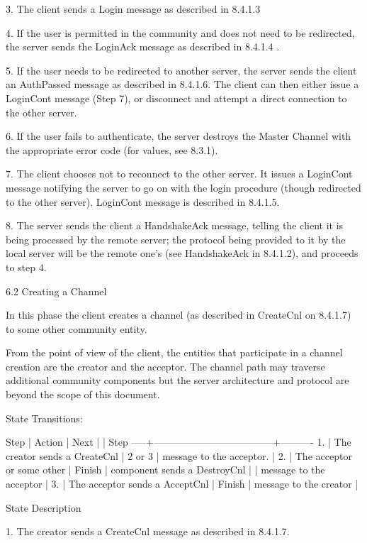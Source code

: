 \documentclass[titlepage,oneside]{book}
\begin{document}
3. The client sends a Login message as described in 8.4.1.3

4. If the user is permitted in the community and does not need to be
redirected, the server sends the LoginAck message as described in
8.4.1.4 .

5. If the user needs to be redirected to another server, the server
sends the client an AuthPassed message as described in 8.4.1.6.
The client can then either issue a LoginCont message (Step 7), or
disconnect and attempt a direct connection to the other server.

6. If the user fails to authenticate, the server destroys the Master
Channel with the appropriate error code (for values, see 8.3.1).

7. The client chooses not to reconnect to the other server. It issues a
LoginCont message notifying the server to go on with the login
procedure (though redirected to the other server). LoginCont message is
described in 8.4.1.5.

8. The server sends the client a HandshakeAck message, telling the
client it is being processed by the remote server; the protocol being
provided to it by the local server will be the remote one's (see
HandshakeAck in 8.4.1.2), and proceeds to step 4.

6.2 Creating a Channel

In this phase the client creates a channel (as described in CreateCnl
on 8.4.1.7) to some other community entity.

From the point of view of the client, the entities that participate in
a channel creation are the creator and the acceptor. The channel path
may traverse additional community components but the server
architecture and protocol are beyond the scope of this document.

State Transitions:

Step | Action                             |  Next
     |                                    |  Step
-----+------------------------------------+----------
1.   | The creator sends a CreateCnl      |  2 or 3
     | message to the acceptor.           |
2.   | The acceptor or some other         |  Finish
     | component sends a DestroyCnl       |
     | message to the acceptor            |
3.   | The acceptor sends a AcceptCnl     |  Finish
     | message to the creator             |

State Description

1. The creator sends a CreateCnl message as described in 8.4.1.7.
\end{document}
